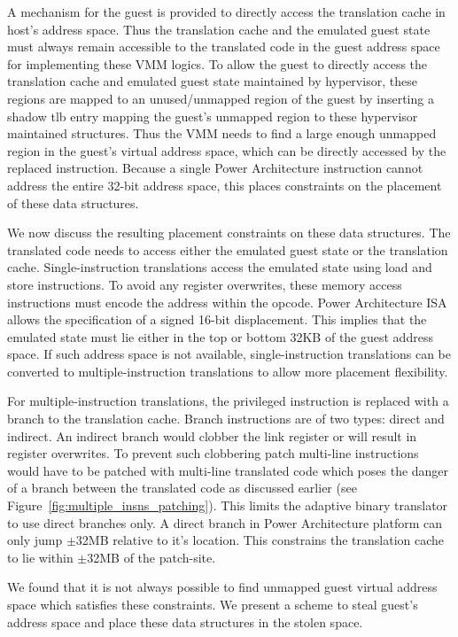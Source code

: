 A mechanism for the guest is provided to directly access the translation cache in host’s address space. Thus the translation cache and the emulated guest state must always remain accessible to the translated code in the guest address space for implementing these VMM logics. To allow the guest to directly access the translation cache and emulated guest state maintained by hypervisor, these regions are mapped to an unused/unmapped region of the guest by inserting a shadow tlb entry mapping the guest's unmapped region to these hypervisor maintained structures. Thus the VMM needs to find a large enough unmapped region in the guest’s virtual address space, which can be directly accessed by the replaced instruction. Because a single Power Architecture instruction cannot address the entire 32-bit address space, this places constraints on the placement of these data structures.

We now discuss the resulting placement constraints on these data structures. The translated code needs to access either the emulated guest state or the translation cache.  Single-instruction translations access the emulated state using load and store instructions. To avoid any register overwrites, these memory access instructions must encode the address within the opcode. Power Architecture ISA allows the specification of a signed 16-bit displacement. This implies that the emulated state must lie either in the top or bottom 32KB of the guest address space. If such address space is not available, single-instruction translations can be converted to multiple-instruction translations to allow more placement flexibility.

For multiple-instruction translations, the privileged instruction is replaced with a branch to the translation cache. Branch instructions are of two types: direct and indirect. An indirect branch would clobber the link register or will result in register overwrites. To prevent such clobbering patch multi-line instructions would have to be patched with multi-line translated code which poses the danger of a branch between the translated code as discussed earlier (see Figure~\ref{fig:multiple_insns_patching}). This limits the adaptive binary translator to use direct branches only. A direct branch in Power Architecture platform can only jump $\pm$32MB relative to it's location. This constrains the translation cache to lie within $\pm$32MB of the patch-site.

We found that it is not always possible to find unmapped guest virtual address space which satisfies these constraints. We present a scheme to steal guest’s address space and place these data structures in the stolen space.

